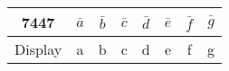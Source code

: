 \begin{center}
	\begin{tabular}{|c|c|c|c|c|c|c|c|} 
		\hline
		7447 & $\bar{a}$ & $\bar{b}$ & $\bar{c}$ & $\bar{d}$ & $\bar{e}$ & $\bar{f}$ & $\bar{g}$   \\
		\hline
		Display & a & b & c & d & e & f & g \\
		\hline
	\end{tabular}
\end{center}
